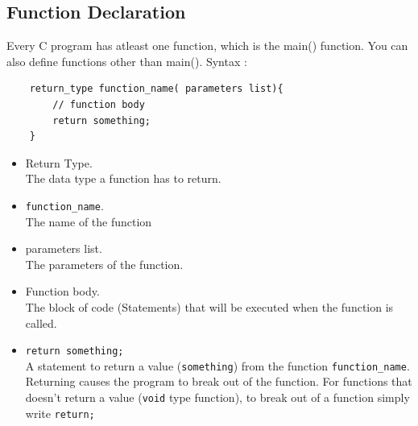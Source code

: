 \subsection{Function Declaration}
Every C program has atleast one function, which is the main() function. You can also define functions other than main().
Syntax :
\begin{verbatim}
    return_type function_name( parameters list){
        // function body
    	return something;
    }
\end{verbatim}
\begin{itemize}
    \item Return Type.\\ The data type a function has to return.
    \item \verb*|function_name|.\\ The name of the function
    \item parameters list.\\
          The parameters of the function.
    \item Function body.\\ The block of code (Statements) that will be executed when the function is called.
    \item \verb|return something;|\\ A statement to return a value (\verb|something|) from the function \verb*|function_name|.
          Returning causes the program to break out of the function.
          For functions that doesn't return a value (\verb|void| type function), to break out of a function simply write \verb|return;|
\end{itemize}

